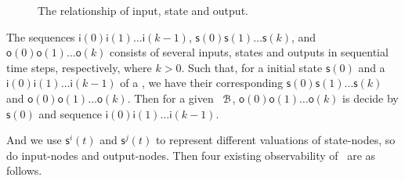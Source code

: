  \begin{figure}[thpb]
      \centering
      
      \caption{The relationship of input, state and output.}
      \label{fig:10}
  \end{figure}
   The sequences $\mathsf{i}(0)\mathsf{i}(1)\ldots\mathsf{i}(k-1)$,  $\mathsf{s}(0)\mathsf{s}(1)\ldots\mathsf{s}(k)$, and $\mathsf{o}(0)\mathsf{o}(1)\ldots\mathsf{o}(k)$ 
 consists of several inputs, states and outputs in sequential time steps,  respectively, where $k>0$. 
 Such that, for a initial state $\mathsf{s}(0)$ and a $\mathsf{i}(0)\mathsf{i}(1)\ldots\mathsf{i}(k-1)$ of a \BCN, we have their corresponding 
$\mathsf{s}(0)\mathsf{s}(1)\ldots\mathsf{s}(k)$ and $\mathsf{o}(0)\mathsf{o}(1)\ldots\mathsf{o}(k)$.  
Then for a given  \BCN\  ${\mathcal{B}}$,  $\mathsf{o}(0)\mathsf{o}(1)\ldots\mathsf{o}(k)$ is decide by
$\mathsf{s}(0)$ and sequence $\mathsf{i}(0)\mathsf{i}(1)\ldots\mathsf{i}(k-1)$. 
 


And we use $\mathsf{s}^{i}(t)$ and $\mathsf{s}^{j}(t)$ to represent different valuations of state-nodes, so do input-nodes and output-nodes. Then four existing observability of \BCNs\ are as follows. 



